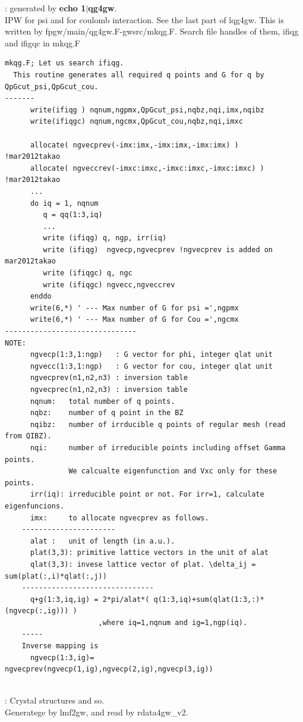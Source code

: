 \documentclass[a4paper,10pt,epsf,fleqn]{article}
\newcommand{\fl}[1]{\noindent{\sf $\bullet$ #1\index{\sf #1}} : }
\newcommand{\exe}[1]{{\bf #1}}
\newcommand{\io}[1]{{\sf  #1}}
\begin{document}
\fl{QGpsi,QGcou} generated by \exe{echo 1$|$qg4gw}.\\
IPW for psi and for coulomb interaction.
See the last part of \io{lqg4gw}.
This is written by fpgw/main/qg4gw.F-gwsrc/mkqg.F.
Search file handles of them, ifiqg and ifigqc in mkqg.F

\begin{verbatim}
mkqg.F; Let us search ifiqg.
  This routine generates all required q points and G for q by QpGcut_psi,QpGcut_cou.
-------
      write(ifiqg ) nqnum,ngpmx,QpGcut_psi,nqbz,nqi,imx,nqibz
      write(ifiqgc) nqnum,ngcmx,QpGcut_cou,nqbz,nqi,imxc

      allocate( ngvecprev(-imx:imx,-imx:imx,-imx:imx) )       !mar2012takao
      allocate( ngveccrev(-imxc:imxc,-imxc:imxc,-imxc:imxc) ) !mar2012takao
      ...
      do iq = 1, nqnum
         q = qq(1:3,iq)
         ...
         write (ifiqg) q, ngp, irr(iq)
         write (ifiqg)  ngvecp,ngvecprev !ngvecprev is added on mar2012takao
         write (ifiqgc) q, ngc
         write (ifiqgc) ngvecc,ngveccrev
      enddo
      write(6,*) ' --- Max number of G for psi =',ngpmx
      write(6,*) ' --- Max number of G for Cou =',ngcmx
-------------------------------
NOTE:
      ngvecp(1:3,1:ngp)   : G vector for phi, integer qlat unit
      ngvecc(1:3,1:ngp)   : G vector for cou, integer qlat unit
      ngvecprev(n1,n2,n3) : inversion table
      ngvecprec(n1,n2,n3) : inversion table
      nqnum:   total number of q points.
      nqbz:    number of q point in the BZ
      nqibz:   number of irrducible q points of regular mesh (read from QIBZ).
      nqi:     number of irreducible points including offset Gamma points. 
               We calcualte eigenfunction and Vxc only for these points.
      irr(iq): irreducible point or not. For irr=1, calculate eigenfuncions.
      imx:     to allocate ngvecprev as follows.
    ----------------------
      alat :   unit of length (in a.u.).
      plat(3,3): primitive lattice vectors in the unit of alat
      qlat(3,3): invese lattice vector of plat. \delta_ij = sum(plat(:,i)*qlat(:,j))
    -------------------------------
      q+g(1:3,iq,ig) = 2*pi/alat*( q(1:3,iq)+sum(qlat(1:3,:)*(ngvecp(:,ig))) )
                      ,where iq=1,nqnum and ig=1,ngp(iq).
    -----
    Inverse mapping is
      ngvecp(1:3,ig)= ngvecprev(ngvecp(1,ig),ngvecp(2,ig),ngvecp(3,ig))
\end{verbatim}
\ \\


\fl{DATA4GW\_V2} Crystal structures and so.\\
Generatege by lmf2gw, and read by rdata4gw\_v2.
\end{document}
